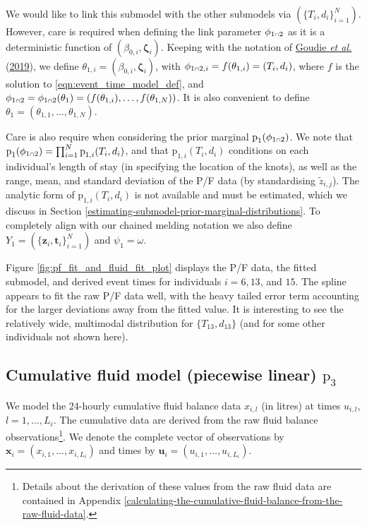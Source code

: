 \documentclass[
  10pt,
  a4paper,
]{article}
\let\Oldcap\cap
\renewcommand{\cap}{\mathrel{\mathsmaller{\Oldcap}}}
\newcommand{\pd}{\text{p}}
\begin{document}
We would like to link this submodel with the other submodels via
\((\{T_{i}, d_{i}\}_{i = 1}^{N})\). However, care is required when
defining the link parameter \(\phi_{1 \cap 2}\) as it is a deterministic
function of \((\beta_{0, i}, \boldsymbol{\zeta}_{i})\). Keeping with the
notation of \protect\hyperlink{ref-goudie_joining_2019}{Goudie \emph{et
al.}} (\protect\hyperlink{ref-goudie_joining_2019}{2019}), we define
\(\theta_{1, i} = (\beta_{0, i}, \boldsymbol{\zeta}_{i})\), with
\(\phi_{1 \cap 2, i} = f(\theta_{1, i}) = (T_{i}, d_{i})\), where \(f\)
is the solution to \eqref{eqn:event_time_model_def}, and
\(\phi_{1 \cap 2} = \phi_{1 \cap 2}(\theta_{1}) = (f(\theta_{1, i}), \ldots, f(\theta_{1, N}))\).
It is also convenient to define
\(\theta_{1} = (\theta_{1, 1}, \ldots, \theta_{1, N})\).

Care is also require when considering the prior marginal
\(\pd_{1}(\phi_{1 \cap 2})\). We note that
\(\pd_{1}(\phi_{1 \cap 2}) = \prod_{i = 1}^{N}\pd_{1, i}(T_{i}, d_{i})\),
and that \(\pd_{1, i}(T_{i}, d_{i})\) conditions on each individual's
length of stay (in specifying the location of the knots), as well as the
range, mean, and standard deviation of the P/F data (by standardising
\(\tilde{z}_{i, j}\)). The analytic form of \(\pd_{1, i}(T_{i}, d_{i})\)
is not available and must be estimated, which we discuss in Section
\ref{estimating-submodel-prior-marginal-distributions}. To completely
align with our chained melding notation we also define
\(Y_{1} = (\{\boldsymbol{z}_{i}, \boldsymbol{t}_{i}\}_{i = 1}^{N})\) and
\(\psi_{1} = \omega\).

Figure \ref{fig:pf_fit_and_fluid_fit_plot} displays the P/F data, the
fitted submodel, and derived event times for individuals \(i = 6, 13\),
and \(15\). The spline appears to fit the raw P/F data well, with the
heavy tailed error term accounting for the larger deviations away from
the fitted value. It is interesting to see the relatively wide,
multimodal distribution for \(\{T_{13}, d_{13}\}\) (and for some other
individuals not shown here).

\hypertarget{cumulative-fluid-model-piecewise-linear-pd_3}{%
\subsection{\texorpdfstring{Cumulative fluid model (piecewise linear)
\(\pd_{3}\)}{Cumulative fluid model (piecewise linear) \textbackslash pd\_\{3\}}}\label{cumulative-fluid-model-piecewise-linear-pd_3}}

We model the 24-hourly cumulative fluid balance data \(x_{i, l}\) (in
litres) at times \(u_{i, l}\), \(l = 1, \ldots, L_{i}\). The cumulative
data are derived from the raw fluid balance observations\footnote{Details
  about the derivation of these values from the raw fluid data are
  contained in Appendix
  \ref{calculating-the-cumulative-fluid-balance-from-the-raw-fluid-data}.}.
We denote the complete vector of observations by
\(\boldsymbol{x}_{i} = (x_{i, 1}, \ldots, x_{i, L_{i}})\) and times by
\(\boldsymbol{u}_{i} = (u_{i, 1}, \ldots, u_{i, L_{i}})\).
\end{document}
